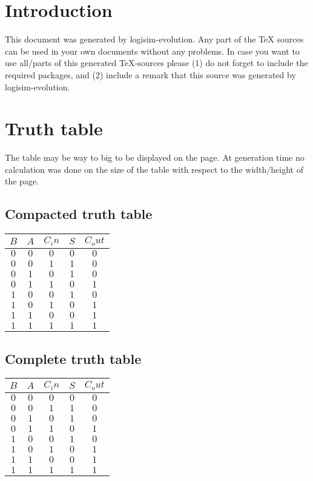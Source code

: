 \documentclass [15pt,a4paper,twoside]{article}
\begin{document}
\section{Introduction}
This document was generated by logisim-evolution. Any part of the TeX sources can be used in your own documents without any problems. In case you want to use all/parts of this generated TeX-sources please (1) do not forget to include the required packages, and (2) include a remark that this source was generated by logisim-evolution.
\section{Truth table}
The table may be way to big to be displayed on the page. At generation time no calculation was done on the size of the table with respect to the width/height of the page.
\subsection{Compacted truth table}
\begin{center}
\begin{tabular}{ccc|cc}
$B$&$A$&$C_in$&$S$&$C_out$\\
\hline
$0$&$0$&$0$&$0$&$0$\\
$0$&$0$&$1$&$1$&$0$\\
$0$&$1$&$0$&$1$&$0$\\
$0$&$1$&$1$&$0$&$1$\\
$1$&$0$&$0$&$1$&$0$\\
$1$&$0$&$1$&$0$&$1$\\
$1$&$1$&$0$&$0$&$1$\\
$1$&$1$&$1$&$1$&$1$\\

\end{tabular}
\end{center}
\subsection{Complete truth table}
\begin{center}
\begin{tabular}{ccc|cc}
$B$&$A$&$C_in$&$S$&$C_out$\\
\hline
$0$&$0$&$0$&$0$&$0$\\
$0$&$0$&$1$&$1$&$0$\\
$0$&$1$&$0$&$1$&$0$\\
$0$&$1$&$1$&$0$&$1$\\
$1$&$0$&$0$&$1$&$0$\\
$1$&$0$&$1$&$0$&$1$\\
$1$&$1$&$0$&$0$&$1$\\
$1$&$1$&$1$&$1$&$1$\\

\end{tabular}
\end{center}
\end{document}
